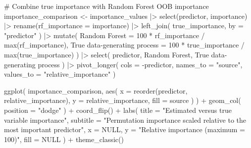 \documentclass[
  letterpaper,
  DIV=11,
  numbers=noendperiod]{scrreprt}
\newenvironment{Shaded}{\begin{snugshade}}{\end{snugshade}}
\newcommand{\AttributeTok}[1]{\textcolor[rgb]{0.40,0.45,0.13}{#1}}
\newcommand{\CommentTok}[1]{\textcolor[rgb]{0.37,0.37,0.37}{#1}}
\newcommand{\ConstantTok}[1]{\textcolor[rgb]{0.56,0.35,0.01}{#1}}
\newcommand{\DecValTok}[1]{\textcolor[rgb]{0.68,0.00,0.00}{#1}}
\newcommand{\FunctionTok}[1]{\textcolor[rgb]{0.28,0.35,0.67}{#1}}
\newcommand{\NormalTok}[1]{\textcolor[rgb]{0.00,0.23,0.31}{#1}}
\newcommand{\OtherTok}[1]{\textcolor[rgb]{0.00,0.23,0.31}{#1}}
\newcommand{\SpecialCharTok}[1]{\textcolor[rgb]{0.37,0.37,0.37}{#1}}
\newcommand{\StringTok}[1]{\textcolor[rgb]{0.13,0.47,0.30}{#1}}
\begin{document}
\begin{Shaded}
\begin{Highlighting}[]
\CommentTok{\# Combine true importance with Random Forest OOB importance}
\NormalTok{importance\_comparison }\OtherTok{\textless{}{-}}\NormalTok{ importance\_values }\SpecialCharTok{|\textgreater{}}
  \FunctionTok{select}\NormalTok{(predictor, importance) }\SpecialCharTok{|\textgreater{}}
  \FunctionTok{rename}\NormalTok{(}\AttributeTok{rf\_importance =}\NormalTok{ importance) }\SpecialCharTok{|\textgreater{}}
  \FunctionTok{left\_join}\NormalTok{(}
\NormalTok{    true\_importance,}
    \AttributeTok{by =} \StringTok{"predictor"}
\NormalTok{  ) }\SpecialCharTok{|\textgreater{}}
  \FunctionTok{mutate}\NormalTok{(}
    \StringTok{\textasciigrave{}}\AttributeTok{Random Forest}\StringTok{\textasciigrave{}} \OtherTok{=}
      \DecValTok{100} \SpecialCharTok{*}\NormalTok{ rf\_importance }\SpecialCharTok{/} \FunctionTok{max}\NormalTok{(rf\_importance),}
    \StringTok{\textasciigrave{}}\AttributeTok{True data{-}generating process}\StringTok{\textasciigrave{}} \OtherTok{=}
      \DecValTok{100} \SpecialCharTok{*}\NormalTok{ true\_importance }\SpecialCharTok{/} \FunctionTok{max}\NormalTok{(true\_importance)}
\NormalTok{  ) }\SpecialCharTok{|\textgreater{}}
  \FunctionTok{select}\NormalTok{(}
\NormalTok{    predictor,}
    \StringTok{\textasciigrave{}}\AttributeTok{Random Forest}\StringTok{\textasciigrave{}}\NormalTok{,}
    \StringTok{\textasciigrave{}}\AttributeTok{True data{-}generating process}\StringTok{\textasciigrave{}}
\NormalTok{  ) }\SpecialCharTok{|\textgreater{}}
  \FunctionTok{pivot\_longer}\NormalTok{(}
    \AttributeTok{cols =} \SpecialCharTok{{-}}\NormalTok{predictor,}
    \AttributeTok{names\_to =} \StringTok{"source"}\NormalTok{,}
    \AttributeTok{values\_to =} \StringTok{"relative\_importance"}
\NormalTok{  )}

\FunctionTok{ggplot}\NormalTok{(}
\NormalTok{  importance\_comparison,}
  \FunctionTok{aes}\NormalTok{(}
    \AttributeTok{x =} \FunctionTok{reorder}\NormalTok{(predictor, relative\_importance),}
    \AttributeTok{y =}\NormalTok{ relative\_importance,}
    \AttributeTok{fill =}\NormalTok{ source}
\NormalTok{  )}
\NormalTok{) }\SpecialCharTok{+}
  \FunctionTok{geom\_col}\NormalTok{(}
    \AttributeTok{position =} \StringTok{"dodge"}
\NormalTok{  ) }\SpecialCharTok{+}
  \FunctionTok{coord\_flip}\NormalTok{() }\SpecialCharTok{+}
  \FunctionTok{labs}\NormalTok{(}
    \AttributeTok{title =} \StringTok{"Estimated versus true variable importance"}\NormalTok{,}
    \AttributeTok{subtitle =} \StringTok{"Permutation importance scaled relative to the most important predictor"}\NormalTok{,}
    \AttributeTok{x =} \ConstantTok{NULL}\NormalTok{,}
    \AttributeTok{y =} \StringTok{"Relative importance (maximum = 100)"}\NormalTok{,}
    \AttributeTok{fill =} \ConstantTok{NULL}
\NormalTok{  ) }\SpecialCharTok{+}
  \FunctionTok{theme\_classic}\NormalTok{()}
\end{Highlighting}
\end{Shaded}
\end{document}
